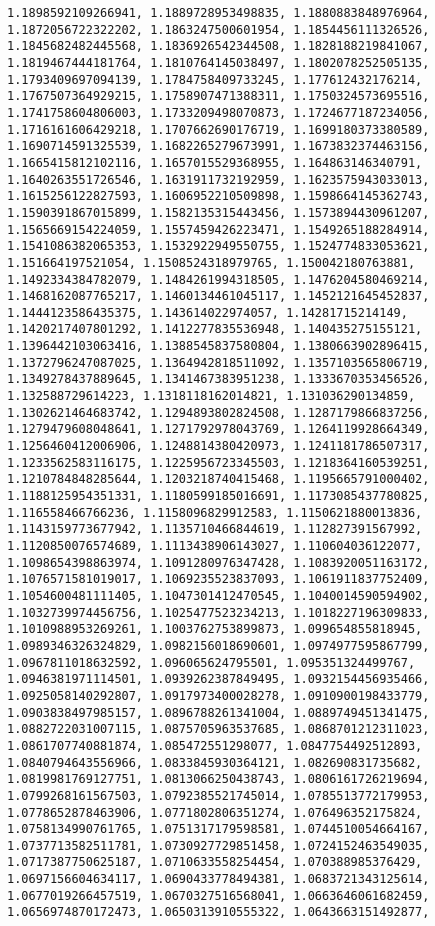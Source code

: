 \documentclass[11pt]{article}
\begin{document}
\begin{Verbatim}[commandchars=\\\{\}]
1.1898592109266941, 1.1889728953498835, 1.1880883848976964, 1.1872056722322202, 1.1863247500601954, 1.1854456111326526, 1.1845682482445568, 1.1836926542344508, 1.1828188219841067, 1.1819467444181764, 1.1810764145038497, 1.1802078252505135, 1.1793409697094139, 1.1784758409733245, 1.177612432176214, 1.1767507364929215, 1.1758907471388311, 1.1750324573695516, 1.1741758604806003, 1.1733209498070873, 1.1724677187234056, 1.1716161606429218, 1.1707662690176719, 1.1699180373380589, 1.1690714591325539, 1.1682265279673991, 1.1673832374463156, 1.1665415812102116, 1.1657015529368955, 1.164863146340791, 1.1640263551726546, 1.1631911732192959, 1.1623575943033013, 1.1615256122827593, 1.1606952210509898, 1.1598664145362743, 1.1590391867015899, 1.1582135315443456, 1.1573894430961207, 1.1565669154224059, 1.1557459426223471, 1.1549265188284914, 1.1541086382065353, 1.1532922949550755, 1.1524774833053621, 1.151664197521054, 1.1508524318979765, 1.150042180763881, 1.1492334384782079, 1.1484261994318505, 1.1476204580469214, 1.1468162087765217, 1.1460134461045117, 1.1452121645452837, 1.1444123586435375, 1.143614022974057, 1.14281715214149, 1.1420217407801292, 1.1412277835536948, 1.140435275155121, 1.1396442103063416, 1.1388545837580804, 1.1380663902896415, 1.1372796247087025, 1.1364942818511092, 1.1357103565806719, 1.1349278437889645, 1.1341467383951238, 1.1333670353456526, 1.132588729614223, 1.1318118162014821, 1.131036290134859, 1.1302621464683742, 1.1294893802824508, 1.1287179866837256, 1.1279479608048641, 1.1271792978043769, 1.1264119928664349, 1.1256460412006906, 1.1248814380420973, 1.1241181786507317, 1.1233562583116175, 1.1225956723345503, 1.1218364160539251, 1.1210784848285644, 1.1203218740415468, 1.1195665791000402, 1.1188125954351331, 1.1180599185016691, 1.1173085437780825, 1.116558466766236, 1.1158096829912583, 1.1150621880013836, 1.1143159773677942, 1.1135710466844619, 1.112827391567992, 1.1120850076574689, 1.1113438906143027, 1.110604036122077, 1.1098654398863974, 1.1091280976347428, 1.1083920051163172, 1.1076571581019017, 1.1069235523837093, 1.1061911837752409, 1.1054600481111405, 1.1047301412470545, 1.1040014590594902, 1.1032739974456756, 1.1025477523234213, 1.1018227196309833, 1.1010988953269261, 1.1003762753899873, 1.099654855818945, 1.0989346326324829, 1.0982156018690601, 1.0974977595867799, 1.0967811018632592, 1.096065624795501, 1.095351324499767, 1.0946381971114501, 1.0939262387849495, 1.0932154456935466, 1.0925058140292807, 1.0917973400028278, 1.0910900198433779, 1.0903838497985157, 1.0896788261341004, 1.0889749451341475, 1.0882722031007115, 1.0875705963537685, 1.0868701212311023, 1.0861707740881874, 1.085472551298077, 1.0847754492512893, 1.0840794643556966, 1.0833845930364121, 1.082690831735682, 1.0819981769127751, 1.0813066250438743, 1.0806161726219694, 1.0799268161567503, 1.0792385521745014, 1.0785513772179953, 1.0778652878463906, 1.0771802806351274, 1.076496352175824, 1.0758134990761765, 1.0751317179598581, 1.0744510054664167, 1.0737713582511781, 1.0730927729851458, 1.0724152463549035, 1.0717387750625187, 1.0710633558254454, 1.070388985376429, 1.0697156604634117, 1.0690433778494381, 1.0683721343125614, 1.0677019266457519, 1.0670327516568041, 1.0663646061682459, 1.0656974870172473, 1.0650313910555322, 1.0643663151492877, 
\end{Verbatim}
\end{document}
